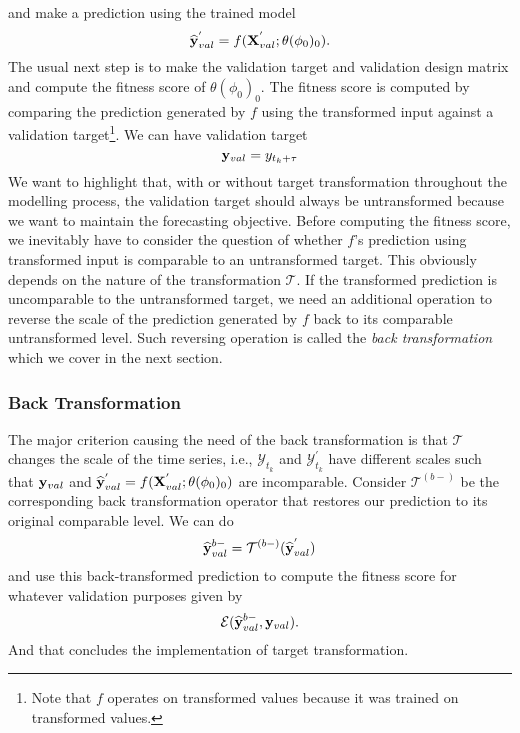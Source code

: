 and make a prediction using the trained model
\begin{equation*}
    \widehat{\mathbf{y}}^{'}_{val} = f(\mathbf{X}^{'}_{val} ; \theta(\phi_0)_0).
\end{equation*}
The usual next step is to make the validation target and validation design matrix and compute the fitness score of $\theta(\phi_0)_0$. The fitness score is computed by comparing the prediction generated by $f$ using the transformed input against a validation target\footnote{Note that $f$ operates on transformed values because it was trained on transformed values.}. We can have validation target
\begin{equation*}
    \mathbf{y}_{val} = y_{t_k + \tau}
\end{equation*}
We want to highlight that, with or without target transformation throughout the modelling process, the validation target should always be untransformed because we want to maintain the forecasting objective. Before computing the fitness score, we inevitably have to consider the question of whether $f$'s prediction using transformed input is comparable to an untransformed target. This obviously depends on the nature of the transformation $\mathcal{T}$. If the transformed prediction is uncomparable to the untransformed target, we need an additional operation to reverse the scale of the prediction generated by $f$ back to its comparable untransformed level. Such reversing operation is called the \textit{back transformation} which we cover in the next section.

\subsubsection{Back Transformation}
The major criterion causing the need of the back transformation is that $\mathcal{T}$ changes the scale of the time series, i.e., $\mathcal{Y}_{t_k}$ and $\mathcal{Y}^{'}_{t_k}$ have different scales such that $\mathbf{y}_{val}$ and $\widehat{\mathbf{y}}^{'}_{val} = f(\mathbf{X}^{'}_{val};\theta(\phi_0)_0)$ are incomparable. Consider $\mathcal{T}^{(b-)}$ be the corresponding back transformation operator that restores our prediction to its original comparable level. We can do
\begin{equation*}
    \widehat{\mathbf{y}}^{b-}_{val} = \mathcal{T}^{(b-)}(\widehat{\mathbf{y}}^{'}_{val})
\end{equation*}
and use this back-transformed prediction to compute the fitness score for whatever validation purposes given by
\begin{equation*}
    \mathcal{E}(\widehat{\mathbf{y}}^{b-}_{val}, \mathbf{y}_{val}).
\end{equation*}
And that concludes the implementation of target transformation.

